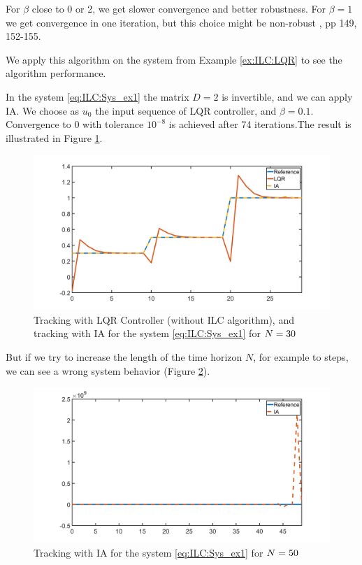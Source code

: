 For $\beta$ close to 0 or 2, we get slower convergence and better robustness. For $\beta = 1$ we get convergence in one iteration, but this choice might be non-robust \cite{ILC}, pp 149, 152-155.

We apply this algorithm on the system from Example \ref{ex:ILC:LQR} to see the algorithm performance. 

\begin{exam}
	\label{ex:ILC:badIA}
	In the system \eqref{eq:ILC:Sys_ex1} the matrix $D = 2$ is invertible, and we can apply IA. We choose as $u_0$ the input sequence of LQR controller, and $\beta = 0.1$. Convergence to 0 with tolerance $10^{-8}$ is achieved after 74 iterations.The result is illustrated in Figure \ref{img:ILC:Ex1_IA}.
			
	\begin{figure}[ht]
		\includegraphics[width=\textwidth]{fig/Ex1_IA.jpg}
		\caption{Tracking with LQR Controller (without ILC algorithm), and tracking with IA for the system \eqref{eq:ILC:Sys_ex1} for $N = 30$} 		\label{img:ILC:Ex1_IA}
	\end{figure}
	
	But if we try to increase the length of the time horizon $N$, for example to {\IAbad} steps, we can see a wrong system behavior (Figure \ref{img:ILC:Ex1_IAbad}). 
		
			\begin{figure}[ht!]
			\centering
			\includegraphics[width=\textwidth]{fig/Ex1_IAbad.jpg}
			\caption{Tracking with IA for the system \eqref{eq:ILC:Sys_ex1} for $N = 50$}
			\label{img:ILC:Ex1_IAbad}
		\end{figure}
	

\end{exam}
